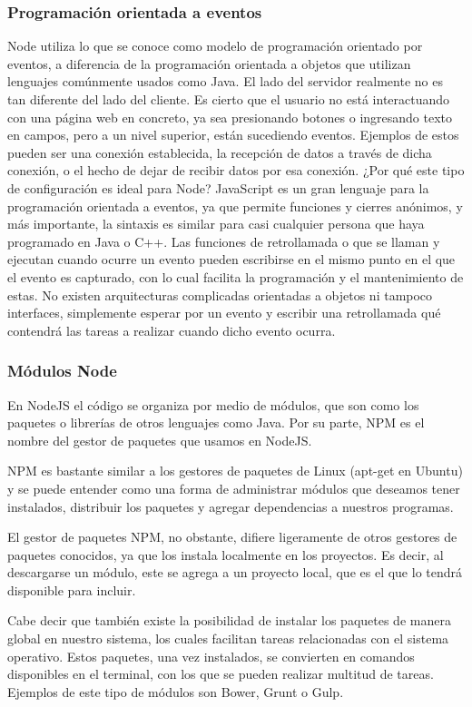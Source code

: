 \subsubsection{Programación orientada a eventos}
Node utiliza lo que se conoce como modelo de programación orientado por eventos, a diferencia de la programación orientada a objetos que utilizan lenguajes comúnmente usados como Java.
El lado del servidor realmente no es tan diferente del lado del cliente. Es cierto que el usuario no está interactuando con una página web en concreto, ya sea presionando botones o ingresando texto en campos, pero a un nivel superior, están sucediendo eventos. Ejemplos de estos pueden ser una conexión establecida, la recepción de datos a través de dicha conexión, o el hecho de dejar de recibir datos por esa conexión.
¿Por qué este tipo de configuración es ideal para Node? JavaScript es un gran lenguaje para la programación orientada a eventos, ya que permite funciones y cierres anónimos, y más importante, la sintaxis es similar para casi cualquier persona que haya programado en Java o C++. Las funciones de retrollamada o  que se llaman y ejecutan cuando ocurre un evento pueden escribirse en el mismo punto en el que el evento es capturado, con lo cual facilita la programación y el mantenimiento de estas. No existen arquitecturas complicadas orientadas a objetos ni tampoco interfaces, simplemente esperar por un evento y escribir una retrollamada qué contendrá las tareas a realizar cuando dicho evento ocurra.

\subsubsection{Módulos Node}
En NodeJS el código se organiza por medio de módulos, que son como los paquetes o librerías de otros lenguajes como Java. Por su parte, NPM es el nombre del gestor de paquetes que usamos en NodeJS.

NPM es bastante similar a los gestores de paquetes de Linux (apt-get en Ubuntu) y se puede entender como una forma de administrar módulos que deseamos tener instalados, distribuir los paquetes y agregar dependencias a nuestros programas.

El gestor de paquetes NPM, no obstante, difiere ligeramente de otros gestores de paquetes conocidos, ya que los instala localmente en los proyectos. Es decir, al descargarse un módulo, este se agrega a un proyecto local, que es el que lo tendrá disponible para incluir.

Cabe decir que también existe la posibilidad de instalar los paquetes de manera global en nuestro sistema, los cuales facilitan tareas relacionadas con el sistema operativo. Estos paquetes, una vez instalados, se convierten en comandos disponibles en el terminal, con los que se pueden realizar multitud de tareas. Ejemplos de este tipo de módulos son Bower, Grunt o Gulp.

\chapterend{}